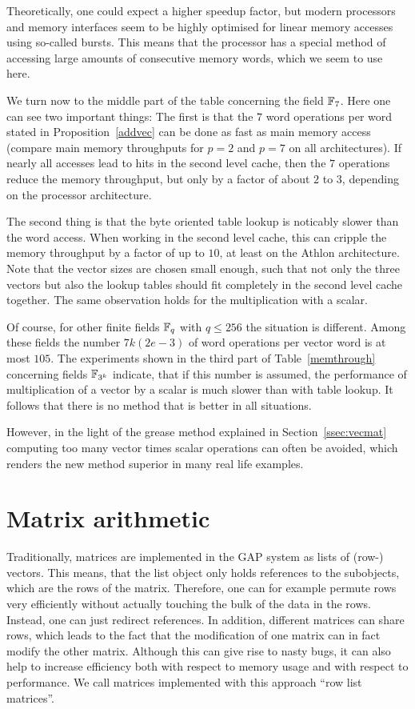 Theoretically, one could expect a higher speedup factor, but modern
processors and memory interfaces seem to be highly optimised for 
linear memory accesses using so-called bursts. This means that the
processor has a special method of accessing large amounts of consecutive
memory words, which we seem to use here.

We turn now to the middle part of the table concerning the field $\mathbb{F}_7$.
Here one can see two important things: The first is that the $7$ word
operations per word stated in Proposition~\ref{addvec} can be done as
fast as main memory access (compare main memory throughputs for $p=2$ and
$p=7$ on all architectures). If nearly all accesses lead to hits in 
the second level cache, then the $7$ operations reduce the memory
throughput, but only by a factor of about $2$ to $3$, depending on
the processor architecture.

The second thing is that the byte oriented table lookup is noticably
slower than the word access. When working in the second level cache,
this can cripple the memory throughput by a factor of up to $10$, at least on
the Athlon architecture. Note that the vector sizes are chosen small
enough, such that not only the three vectors but also the lookup tables
should fit completely in the second level cache together.
The same observation holds for the multiplication with a scalar. 

Of course, for other finite fields $\mathbb{F}_q$ with $q \le 256$ the situation
is different. Among these fields the number $7k(2e-3)$ of word
operations per vector word is at most $105$. The experiments shown in
the third part of Table~\ref{memthrough} concerning fields $\mathbb{F}_{3^k}$ 
indicate, that
if this number is assumed, the performance of multiplication of a vector
by a scalar is much slower than with table lookup. It follows that there 
is no method that is better in all situations.

However, in the light of the grease method explained in
Section~\ref{ssec:vecmat} computing too many vector times scalar 
operations can often be avoided, which renders the new method
superior in many real life examples.



\section{Matrix arithmetic}
\label{sec:matarith}

Traditionally, matrices are implemented in the {\sf GAP} system as
lists of (row-) vectors. This means, that the list object only
holds references to the subobjects, which are the rows of the matrix.
Therefore, one can for example permute rows very efficiently without
actually touching the bulk of the data in the rows. Instead, one can
just redirect references. In addition, different matrices can share
rows, which leads to the fact that the modification of one matrix
can in fact modify the other matrix. Although this can give rise to
nasty bugs, it can also help to increase efficiency both with respect
to memory usage and with respect to performance. We call matrices
implemented with this approach ``row list matrices''.

